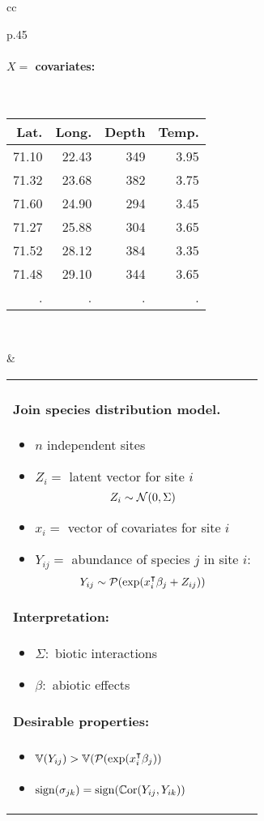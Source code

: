 \documentclass[8pt]{beamer}
\begin{document}
{\begin{tabular}{cc}
\begin{tabular}{p{}}
      \paragraph{$X =$ covariates:} ~ \\
        {\footnotesize \begin{tabular}{rrrr}
        Lat. & Long. & Depth & Temp. \\
        \hline
        71.10 & 22.43 & 349 & 3.95 \\
        71.32 & 23.68 & 382 & 3.75 \\
        71.60 & 24.90 & 294 & 3.45 \\
        71.27 & 25.88 & 304 & 3.65 \\
        71.52 & 28.12 & 384 & 3.35 \\
        71.48 & 29.10 & 344 & 3.65 \\
        . & . & . & .
      \end{tabular}} 
      \bigskip ~
      \bigskip ~
    \end{tabular}
    &
    \begin{tabular}{p{}}
      \pause
      \paragraph{Join species distribution model.}
      \begin{itemize}
       \item $n$ independent sites
       \item $Z_i=$ latent vector for site $i$
       $$
       Z_i \sim \mathcal{N}(0, \Sigma)
       $$
       \item $x_i =$ vector of covariates for site $i$
       \item $Y_{ij} =$ abundance of species $j$ in site $i$:
       $$
       Y_{ij} \sim \mathcal{P}(\exp(x_i^\intercal \beta_j + Z_{ij}))
       $$
      \end{itemize}
      
      \pause \bigskip
      \paragraph{Interpretation:}
      \begin{itemize}
       \item $\Sigma:$ biotic interactions 
       \item $\beta:$ abiotic effects 
      \end{itemize}
 
      \bigskip \bigskip
      \paragraph{Desirable properties:}
      \begin{itemize}
      \item $\mathbb V(Y_{ij}) > \mathbb V(\mathcal{P}(\exp(x_i^\intercal \beta_j))$
      \item $\operatorname{sign}(\sigma_{jk}) = \operatorname{sign}({\mathbb C}\text{or}(Y_{ij}, Y_{ik}))$ 
      \end{itemize}
    \end{tabular}
  \end{tabular}
  
}
\end{document}
